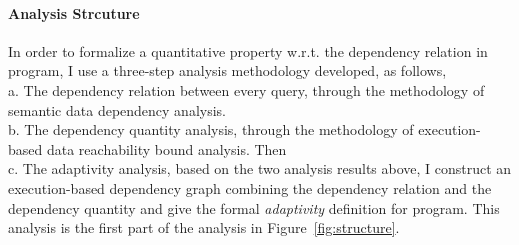 \paragraph*{Analysis Strcuture}
In order to formalize a quantitative property w.r.t. the dependency relation in program, I
use a three-step analysis methodology developed, 
 as follows,
\\
 a. The dependency relation between every query, through the methodology of semantic data dependency analysis.
\\
 b. The dependency quantity analysis, through the methodology of execution-based data reachability bound analysis. Then 
\\
 c. The adaptivity analysis, based on the two analysis results above, 
 I construct an execution-based dependency graph combining the dependency relation and the dependency quantity
    and give the formal \emph{adaptivity} definition 
    for program.
    This analysis is the first part of the analysis in Figure~\ref{fig:structure}.